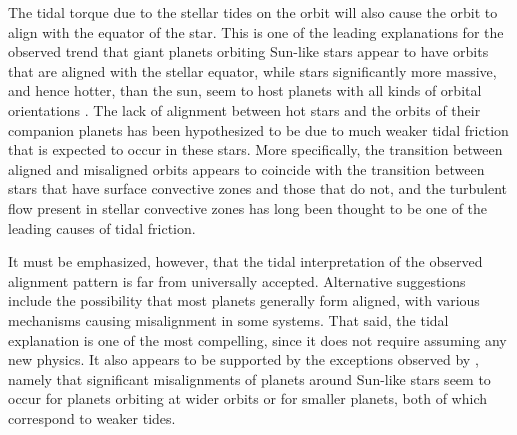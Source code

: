 The tidal torque due to the stellar tides on the orbit will also cause the orbit
to align with the equator of the star. This is one of the leading explanations
for the observed trend that giant planets orbiting Sun-like stars appear to
have orbits that are aligned with the stellar equator, while stars significantly
more massive, and hence hotter, than the sun, seem to host planets with all
kinds of orbital orientations \citep[c.f. chapter 5.2 of][]{Winn_Fabrycky_2015}.
The lack of alignment between hot stars and the orbits of their companion
planets has been hypothesized to be due to much weaker tidal friction that is
expected to occur in these stars. More specifically, the transition between
aligned and misaligned orbits appears to coincide with the transition between
stars that have surface convective zones and those that do not, and the
turbulent flow present in stellar convective zones has long been thought to be
one of the leading causes of tidal friction.

It must be emphasized, however, that the tidal interpretation of the observed
alignment pattern is far from universally accepted.  Alternative suggestions
include the possibility that most planets generally form aligned, with various
mechanisms causing misalignment in some systems. That said, the tidal
explanation is one of the most compelling, since it does not require assuming
any new physics. It also appears to be supported by the exceptions observed by
\citet{Winn_Fabrycky_2015}, namely that significant misalignments of planets
around Sun-like stars seem to occur for planets orbiting at wider orbits or for
smaller planets, both of which correspond to weaker tides.

